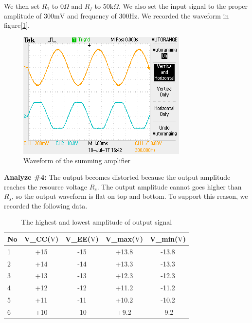 \phantom{ } We then set $ R_1 $ to $ 0\si{\Omega} $ and $ R_f $ to $ 50\si{\kilo\Omega} $. We also set the input signal to the proper amplitude of 300$ \si{\milli\volt} $ and frequency of $ 300\si{\hertz} $. We recorded the waveform in figure[\ref{fig:108}].
\begin{figure}[!htbp]
	\centering 
	\begin{framed}
		\includegraphics[width=\linewidth]{images/osc2.png}
		\caption{Waveform of the summing amplifier}
		\label{fig:108} 
	\end{framed}
\end{figure} 

\textbf{Analyze \#4:} \newline
\phantom{ } The output becomes distorted because the output amplitude reaches the resource voltage $ R_s $. The output amplitude cannot goes higher than $ R_s $, so the output waveform is flat on top and bottom. To support this reason, we recorded the following data.
\begin{table}[!htbp]
	\centering
	\caption{The highest and lowest amplitude of output signal}
	\begin{tabular}{lcccc}
		\toprule
		No &V\_CC($ \si{\volt} $) &V\_EE($ \si{\volt} $)&V\_max($ \si{\volt} $)&V\_min($ \si{\volt} $)\\
		\midrule
		1	&+15	&-15	&+13.8	&-13.8	\\
		2	&+14	&-14	&+13.3	&-13.3	\\
		3	&+13	&-13	&+12.3	&-12.3	\\
		4	&+12	&-12	&+11.2	&-11.2	\\
		5	&+11	&-11	&+10.2	&-10.2	\\
		6	&+10	&-10	&+9.2	&-9.2	\\
		\bottomrule
	\end{tabular}
	\label{tab:distort}
\end{table}



